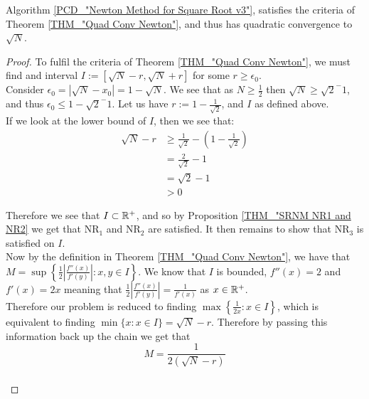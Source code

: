 \begin{SRNM NR3 for v3}
\label{THM_"NR3 for v3"}
Algorithm \ref{PCD_"Newton Method for Square Root v3"}, satisfies the criteria of Theorem \ref{THM_"Quad Conv Newton"}, and thus has quadratic convergence to \(\sqrt{N}\).
\end{SRNM NR3 for v3}
\begin{proof}
To fulfil the criteria of Theorem \ref{THM_"Quad Conv Newton"}, we must find and interval \(I := [\sqrt{N}-r, \sqrt{N} + r]\) for some \(r \ge \epsilon_0\).\\

Consider \(\epsilon_0 = |\sqrt{N} - x_0| = 1 - \sqrt{N}\). We see that as \(N \ge \frac{1}{2}\) then \(\sqrt{N} \ge \sqrt{2}^-1\), and thus \(\epsilon_0 \le 1 - \sqrt{2}^-1\). Let us have \(r := 1 - \frac{1}{\sqrt{2}}\), and \(I\) as defined above.\\

If we look at the lower bound of \(I\), then we see that:
\begin{displaymath}
\begin{align*}
\sqrt{N} - r &\ge \frac{1}{\sqrt{2}} - (1 - \frac{1}{\sqrt{2}})\\
	&= \frac{2}{\sqrt{2}} - 1\\
	&= \sqrt{2} - 1 \\
	&> 0
\end{align*}
\end{displaymath}

Therefore we see that \(I \subset \mathbb{R}^+\), and so by Proposition \ref{THM_"SRNM NR1 and NR2} we get that \(\mathrm{NR}_1\) and \(\mathrm{NR}_2\) are satisfied. It then remains to show that \(\mathrm{NR}_3\) is satisfied on \(I\).\\

Now by the definition in Theorem \ref{THM_"Quad Conv Newton"}, we have that \(M = \sup\left\{\frac{1}{2}\left|\frac{f''(x)}{f'(y)}\right| : x, y \in I\right\}\). We know that \(I\) is bounded, \(f''(x) = 2\) and \(f'(x) = 2x\) meaning that \(\frac{1}{2}\left|\frac{f''(x)}{f'(y)}\right| = \frac{1}{f'(x)}\) as \(x \in \mathbb{R}^+\).\\ 

Therefore our problem is reduced to finding \(\max\left\{\frac{1}{2x} : x \in I\right\}\), which is equivalent to finding \(\min\{x : x \in I\} = \sqrt{N} - r\). Therefore by passing this information back up the chain we get that \[M = \frac{1}{2(\sqrt{N} - r)}\]\\


\end{proof}
